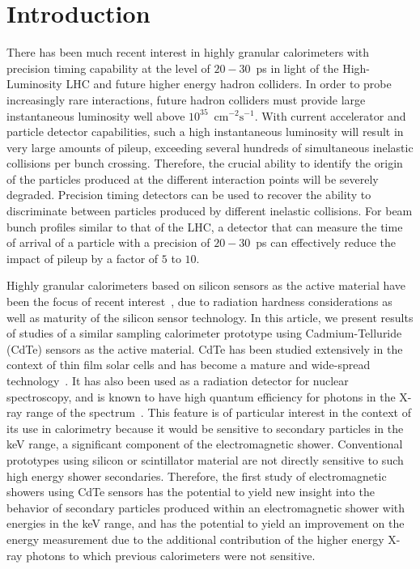 \section{Introduction} 

There has been much recent interest in highly granular calorimeters with 
precision timing capability at the level of $20-30$~ps in light of the High-Luminosity
LHC and future higher energy hadron colliders. In order to probe increasingly
rare interactions, future hadron colliders must provide large 
instantaneous luminosity well above $10^{35}$~$\mathrm{cm}^{-2}\mathrm{s}^{-1}$.
With current accelerator and particle detector capabilities, such a high 
instantaneous luminosity will result in very large amounts
of pileup, exceeding several hundreds of simultaneous inelastic collisions per
bunch crossing. Therefore, the crucial ability to identify the origin 
of the particles produced at the different interaction points will be severely 
degraded. Precision timing detectors can be used to recover the ability to 
discriminate between particles produced by different inelastic collisions.
For beam bunch profiles similar to that of the LHC, a detector 
that can measure the time of arrival of a particle
with a precision of $20-30$~ps can effectively reduce the impact of
pileup by a factor of $5$ to $10$. 

Highly granular calorimeters based on silicon sensors as the active material 
have been the focus of recent interest~\cite{Adloff:2009,Butler:2020886}, due to
radiation hardness considerations as well as maturity of the silicon sensor
technology. In this article, we present results of studies of a similar
sampling calorimeter prototype using Cadmium-Telluride (CdTe) sensors as the 
active material. CdTe has been studied extensively in the context
of thin film solar cells and has become a mature and wide-spread
technology~\cite{cdtegeneric}. It has also been used as a radiation
detector for nuclear spectroscopy, and is known to have high
quantum efficiency for photons in the X-ray range of the 
spectrum~\cite{cdtesensorsgeneric,cdtesensors1,cdtesensors2,cdtesensors3}.
This feature is of particular interest in the context of its use
in calorimetry because it would be sensitive to secondary particles in the keV range, 
a significant component of the electromagnetic shower. Conventional prototypes 
using silicon or scintillator material are not directly sensitive to such high 
energy shower secondaries. Therefore, the first study of electromagnetic
showers using CdTe sensors has the potential to yield new insight
into the behavior of secondary particles produced within an 
electromagnetic shower with energies in the keV range, and has the potential
to yield an improvement on the energy measurement due to
the additional contribution of the higher energy X-ray photons to which previous
calorimeters were not sensitive.

